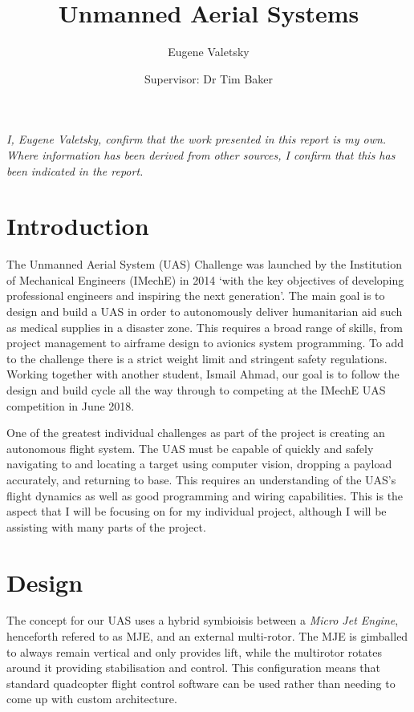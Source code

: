 \documentclass[11pt]{article}
\author{Eugene Valetsky\\ \and Supervisor: Dr Tim Baker}
\title{Unmanned Aerial Systems}
\begin{document}
\maketitle
\tableofcontents
\listoffigures
\newpage

\emph{I, Eugene Valetsky, confirm that the work presented in this report is my own. Where information has been derived from other sources, I confirm that this has been indicated in the report.}



\section{Introduction}
The Unmanned Aerial System (UAS) Challenge was launched by the Institution of Mechanical Engineers (IMechE) in 2014 `with the key objectives of developing professional engineers and inspiring the next generation'\cite{IMechE_about_uas}. The main goal is to design and build a UAS in order to autonomously deliver humanitarian aid such as medical supplies in a disaster zone. This requires a broad range of skills, from project management to airframe design to avionics system programming. To add to the challenge there is a strict weight limit and stringent safety regulations. Working together with another student, Ismail Ahmad, our goal is to follow the design and build cycle all the way through to competing at the IMechE UAS competition in June 2018.

One of the greatest individual challenges as part of the project is creating an autonomous flight system. The UAS must be capable of quickly and safely navigating to and locating a target using computer vision, dropping a payload accurately, and returning to base. This requires an understanding of the UAS’s flight dynamics as well as good programming and wiring capabilities. This is the aspect that I will be focusing on for my individual project, although I will be assisting with many parts of the project.

\section{Design}
The concept for our UAS uses a hybrid symbioisis between a \emph{Micro Jet Engine}, henceforth refered to as MJE, and an external multi-rotor. The MJE is gimballed to always remain vertical and only provides lift, while the multirotor rotates around it providing stabilisation and control. This configuration means that standard quadcopter flight control software can be used rather than needing to come up with custom architecture.
\end{document}
